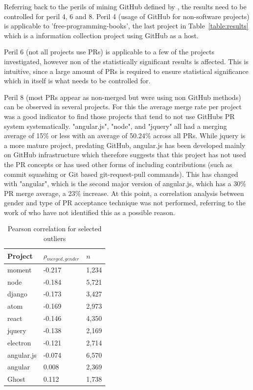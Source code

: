 Referring back to the perils of mining GitHub defined by \citeauthor{perils-github:2015}, the results need to be controlled for peril 4, 6 and 8. Peril 4 (usage of GitHub for non-software projects) is applicable to 'free-programming-books', the last project in Table~\ref{table:results} which is a information collection project using GitHub as a host.

Peril 6 (not all projects use \ac{PR}s) is applicable to a few of the projects investigated, however non of the statistically significant results is affected. This is intuitive, since a large amount of \ac{PR}s is required to ensure statistical significance which in itself is what needs to be controlled for.

Peril 8 (most \ac{PR}s appear as non-merged but were using non GitHub methods) can be observed in several projects. For this the average merge rate per project was a good indicator to find those projects that tend to not use GitHubs \ac{PR} system systematically. "angular.js", "node", and "jquery" all had a merging average of 15\% or less with an average of 50.24\% across all \ac{PR}s. While jquery is a more mature project, predating GitHub, angular.js has been developed mainly on GitHub infrastructure which therefore suggests that this project has not used the \ac{PR} concepts or has used other forms of including contributions (such as commit squashing or Git based git-request-pull commands). This has changed with "angular", which is the second major version of angular.js, which has a 30\% \ac{PR} merge average, a 23\% increase. At this point, a correlation analysis between gender and type of \ac{PR} acceptance technique was not performed, referring to the work of \citeauthor{genderdiff:2016} who have not identified this as a possible reason.

\begin{table}[!t]
\renewcommand{\arraystretch}{1.3}
          \caption{Pearson correlation for selected outliers}
          \label{table:pearsonoutliers}
          \centering

          \begin{tabular} {  l | l | l}
		  \textbf{Project}        &       $\rho_{merged,gender}$		&	$n$		\\ \hline
		moment			&	-0.217					&	1,234		\\
		node			&	-0.184					&	5,721		\\
		django			&   -0.173					&   3,427		\\
		atom			&	-0.169					&	2,973		\\
		react			&	-0.146					&	4,350		\\
		jquery			&	-0.138					&	2,169		\\
		electron		&	-0.121		  			&	2,714		\\
		angular.js		&	-0.074					&	6,570		\\
		angular			&	 0.008					&	2,369		\\
		Ghost			&	 0.112 					&	1,738		\\

         \end{tabular}

\end{table}

